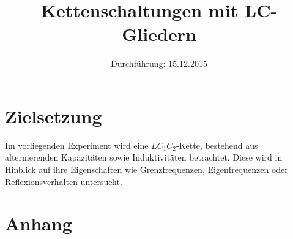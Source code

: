 

\subject{Versuchsprotokoll zum Versuch Nr. 356}
\title{Kettenschaltungen mit LC-Gliedern}
\date{
  Durchführung: 15.12.2015
}



\maketitle
\newpage

\section{Zielsetzung}

Im vorliegenden Experiment wird eine $L C_1 C_2$-Kette, bestehend aus alternierenden Kapazitäten sowie Induktivitäten betrachtet.
Diese wird in Hinblick auf ihre Eigenschaften wie Grenzfrequenzen, Eigenfrequenzen oder Reflexionsverhalten untersucht.







\section{Anhang}


